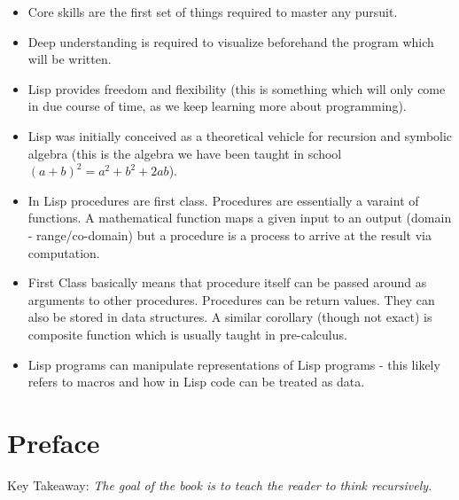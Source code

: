 \documentclass[11pt]{article}
\begin{document}
\vspace{1em}

\begin{itemize}
\item Core skills are the first set of things required to master any pursuit.
\item Deep understanding is required to visualize beforehand the program which will be written.
\item Lisp provides freedom and flexibility (this is something which will only come in due course of time, as we keep
learning more about programming).
\item Lisp was initially conceived as a theoretical vehicle for recursion and symbolic algebra (this is the algebra we
have been taught in school \((a + b)^2 = a^2 + b^2 + 2ab\)).
\item In Lisp procedures are first class. Procedures are essentially a varaint of functions. A mathematical function maps
a given input to an output (domain - range/co-domain) but a procedure is a process to arrive at the result via
computation.
\item First Class basically means that procedure itself can be passed around as arguments to other procedures. Procedures
can be return values. They can also be stored in data structures. A similar corollary (though not exact) is
composite function which is usually taught in pre-calculus.
\item Lisp programs can manipulate representations of Lisp programs - this likely refers to macros and how in Lisp code can
be treated as data.
\end{itemize}

\newpage
\section{Preface}
\label{sec:org4df1934}

Key Takeaway:
\emph{The goal of the book is to teach the reader to think recursively.}

\vspace{1em}
\end{document}

